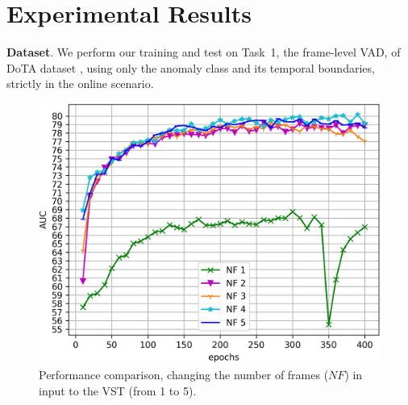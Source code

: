 \section{Experimental Results}
\label{sec:experiments}

\noindent\textbf{Dataset}.
We perform our training and test on Task~1, the frame-level VAD, of DoTA dataset \cite{9712446}, using only the anomaly class and its temporal boundaries, strictly in the online scenario.

\newcommand{\figsize}{0.8\columnwidth}

\begin{figure}[t!]
\centerline{\includegraphics[clip,width=\figsize]{images/exp_1.jpg}}
	\caption{Performance comparison, changing the number of frames ($\mathit{NF}$) in input to the VST (from 1 to 5).}
	\label{fig:num-frames-vst}
\end{figure}


